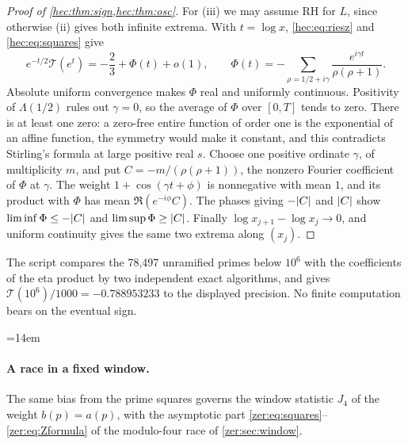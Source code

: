 \begin{proof}[Proof of \cref{hec:thm:sign,hec:thm:osc}]
For (iii) we may assume RH for $L$, since otherwise (ii) gives both infinite extrema. With $t=\log x$,
\eqref{hec:eq:riesz} and \eqref{hec:eq:squares} give
\[
 e^{-t/2}\mathcal{T}(e^t)=-\frac23+\Phi(t)+o(1),\qquad
 \Phi(t)=-\sum_{\rho=1/2+i\gamma}\frac{e^{i\gamma t}}{\rho(\rho+1)} .
\]
Absolute uniform convergence makes $\Phi$ real and uniformly continuous. Positivity of $\Lambda(1/2)$ rules
out $\gamma=0$, so the average of $\Phi$ over $[0,T]$ tends to zero. There is at least one zero: a
zero-free entire function of order one is the exponential of an affine function, the symmetry would make
it constant, and this contradicts Stirling's formula at large positive real $s$. Choose one positive
ordinate $\gamma$, of multiplicity $m$, and put $C=-m/(\rho(\rho+1))$, the nonzero Fourier coefficient of
$\Phi$ at $\gamma$. The weight $1+\cos(\gamma t+\phi)$ is nonnegative with mean $1$, and its product with
$\Phi$ has mean $\Re(e^{-i\phi}C)$. The phases giving $-\lvert C\rvert$ and $\lvert C\rvert$ show
$\liminf\Phi\le-\lvert C\rvert$ and $\limsup\Phi\ge\lvert C\rvert$. Finally $\log x_{j+1}-\log x_j\to0$, and uniform
continuity gives the same two extrema along $(x_j)$.
\end{proof}

The script  compares the
78{,}497 unramified primes below $10^6$ with the coefficients of the eta product by two independent exact
algorithms, and gives $\mathcal{T}(10^6)/1000=-0.788953233$ to the displayed precision. No finite
computation bears on the eventual sign.
{\emergencystretch=14em\par}

\paragraph{A race in a fixed window.}
The same bias from the prime squares governs the window statistic $J_4$ of the weight $b(p)=a(p)$, with
the asymptotic part \eqref{zer:eq:squares}--\eqref{zer:eq:Zformula} of the modulo-four race of
\cref{zer:sec:window}.


